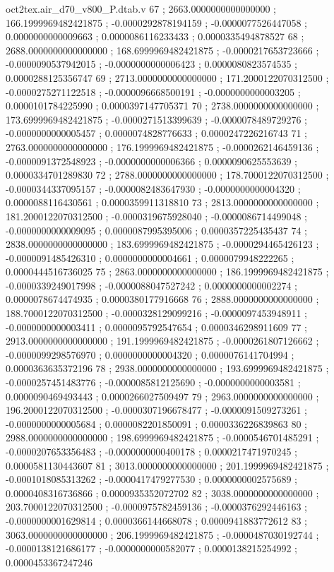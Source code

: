 \begin{filecontents}[overwrite]{oct2tex.air_d70_v800_P.dtab.v}
67 ; 2663.0000000000000000 ; 166.1999969482421875 ; -0.0000292878194159 ; -0.0000077526447058 ; 0.0000000000009663 ; 0.0000086116233433 ; 0.0000335494878527
68 ; 2688.0000000000000000 ; 168.6999969482421875 ; -0.0000217653723666 ; -0.0000090537942015 ; -0.0000000000006423 ; 0.0000080823574535 ; 0.0000288125356747
69 ; 2713.0000000000000000 ; 171.2000122070312500 ; -0.0000275271122518 ; -0.0000096668500191 ; -0.0000000000003205 ; 0.0000101784225990 ; 0.0000397147705371
70 ; 2738.0000000000000000 ; 173.6999969482421875 ; -0.0000271513399639 ; -0.0000078489729276 ; -0.0000000000005457 ; 0.0000074828776633 ; 0.0000247226216743
71 ; 2763.0000000000000000 ; 176.1999969482421875 ; -0.0000262146459136 ; -0.0000091372548923 ; -0.0000000000006366 ; 0.0000090625553639 ; 0.0000334701289830
72 ; 2788.0000000000000000 ; 178.7000122070312500 ; -0.0000344337095157 ; -0.0000082483647930 ; -0.0000000000004320 ; 0.0000088116430561 ; 0.0000359911318810
73 ; 2813.0000000000000000 ; 181.2000122070312500 ; -0.0000319675928040 ; -0.0000086714499048 ; -0.0000000000009095 ; 0.0000087995395006 ; 0.0000357225435437
74 ; 2838.0000000000000000 ; 183.6999969482421875 ; -0.0000294465426123 ; -0.0000091485426310 ; 0.0000000000004661 ; 0.0000079948222265 ; 0.0000444516736025
75 ; 2863.0000000000000000 ; 186.1999969482421875 ; -0.0000339249017998 ; -0.0000088047527242 ; 0.0000000000002274 ; 0.0000078674474935 ; 0.0000380177916668
76 ; 2888.0000000000000000 ; 188.7000122070312500 ; -0.0000328129099216 ; -0.0000097453948911 ; -0.0000000000003411 ; 0.0000095792547654 ; 0.0000346298911609
77 ; 2913.0000000000000000 ; 191.1999969482421875 ; -0.0000261807126662 ; -0.0000099298576970 ; 0.0000000000004320 ; 0.0000076141704994 ; 0.0000363635372196
78 ; 2938.0000000000000000 ; 193.6999969482421875 ; -0.0000257451483776 ; -0.0000085812125690 ; -0.0000000000003581 ; 0.0000090469493443 ; 0.0000266027509497
79 ; 2963.0000000000000000 ; 196.2000122070312500 ; -0.0000307196678477 ; -0.0000091509273261 ; -0.0000000000005684 ; 0.0000082201850091 ; 0.0000336226839863
80 ; 2988.0000000000000000 ; 198.6999969482421875 ; -0.0000546701485291 ; -0.0000207653356483 ; -0.0000000000400178 ; 0.0000217471970245 ; 0.0000581130443607
81 ; 3013.0000000000000000 ; 201.1999969482421875 ; -0.0001018085313262 ; -0.0000417479277530 ; 0.0000000002575689 ; 0.0000408316736866 ; 0.0000935352072702
82 ; 3038.0000000000000000 ; 203.7000122070312500 ; -0.0000975782459136 ; -0.0000376292446163 ; -0.0000000001629814 ; 0.0000366144668078 ; 0.0000941883772612
83 ; 3063.0000000000000000 ; 206.1999969482421875 ; -0.0000487030192744 ; -0.0000138121686177 ; -0.0000000000582077 ; 0.0000138215254992 ; 0.0000453367247246

\end{filecontents}

